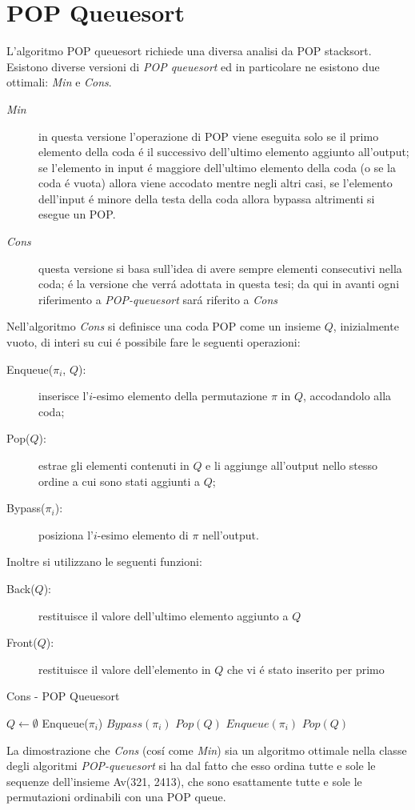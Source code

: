 \section*{POP Queuesort}L'algoritmo POP queuesort richiede una diversa analisi da POP stacksort.\\
Esistono diverse versioni di \textit{POP queuesort} ed in particolare ne esistono due ottimali\cite{cioni2021sorting}: \textit{Min} e \textit{Cons}.
\begin{description}
	\item[\textit{Min}] in questa versione l'operazione di POP viene eseguita solo se il primo elemento della coda \'e il successivo dell'ultimo elemento aggiunto all'output; se l'elemento in input \'e maggiore dell'ultimo elemento della coda (o se la coda \'e vuota) allora viene accodato mentre negli altri casi, se l'elemento dell'input \'e minore della testa della coda allora bypassa altrimenti si esegue un POP.
	\item[\textit{Cons}] questa versione si basa sull'idea di avere sempre elementi consecutivi nella coda; \'e la versione che verr\'a adottata in questa tesi; da qui in avanti ogni riferimento a \textit{POP-queuesort} sar\'a riferito a \textit{Cons}
\end{description}
Nell'algoritmo \textit{Cons} si definisce una coda POP come un insieme $Q$, inizialmente vuoto, di interi su cui \'e possibile fare le seguenti operazioni:
\begin{description}
	\item[Enqueue($\pi_i$, $Q$):] inserisce l'$i$-esimo elemento della permutazione $\pi$ in $Q$, accodandolo alla coda;
	\item[Pop($Q$):] estrae gli elementi contenuti in $Q$ e li aggiunge all'output nello stesso ordine a cui sono stati aggiunti a $Q$;
	\item[Bypass($\pi_i$):] posiziona l'$i$-esimo elemento di $\pi$ nell'output.
\end{description}
Inoltre si utilizzano le seguenti funzioni:
\begin{description}
	\item[Back($Q$):] restituisce il valore dell'ultimo elemento aggiunto a $Q$
	\item[Front($Q$):] restituisce il valore dell'elemento in $Q$ che vi \'e stato inserito per primo
\end{description}
\begin{algorithm}[H]
   \caption{Cons - POP Queuesort}
\begin{algorithmic}[1]
\State $Q\leftarrow\emptyset$ 
		\State Enqueue($\pi_i$)
	\Else
			\State $Bypass(\pi_i)$
		\Else
			\State $Pop(Q)$
			\State $Enqueue(\pi_i)$
		\EndIf
	\EndIf
\EndFor
{}
\State $Pop(Q)$
\EndIf
\end{algorithmic}
\end{algorithm}
La dimostrazione che \textit{Cons} (cos\'i come \textit{Min}) sia un algoritmo ottimale nella classe degli algoritmi \textit{POP-queuesort} si ha dal fatto che esso ordina tutte e sole le sequenze dell'insieme Av(321, 2413), che sono esattamente tutte e sole le permutazioni ordinabili con una POP queue\cite{cioni2021sorting}.
